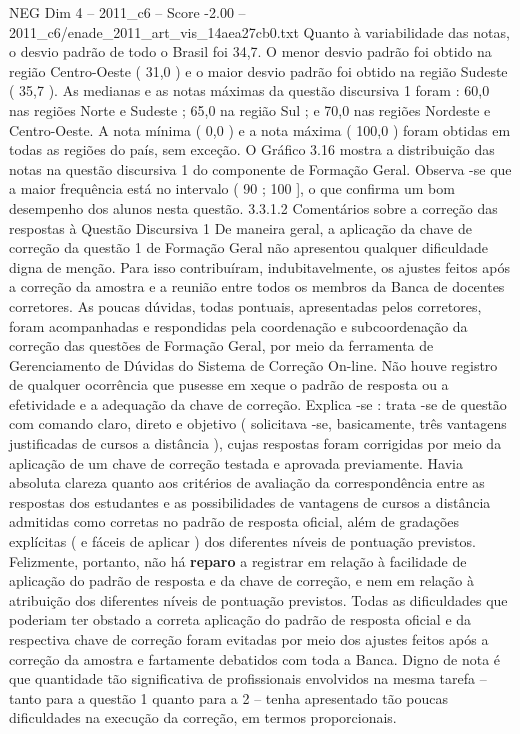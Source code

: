 \begin{textsample}{NEG Dim 4 – 2011\_c6 – Score -2.00 – 2011\_c6/enade\_2011\_art\_vis\_14aea27cb0.txt}
Quanto à variabilidade das notas, o desvio padrão de todo o Brasil foi 34,7.
O menor desvio padrão foi obtido na região Centro-Oeste ( 31,0 ) e o maior desvio padrão foi obtido na região Sudeste ( 35,7 ).
As medianas e as notas máximas da questão discursiva 1 foram : 60,0 nas regiões Norte e Sudeste ; 65,0 na região Sul ; e 70,0 nas regiões Nordeste e Centro-Oeste.
A nota mínima ( 0,0 ) e a nota máxima ( 100,0 ) foram obtidas em todas as regiões do país, sem exceção.
O Gráfico 3.16 mostra a distribuição das notas na questão discursiva 1 do componente de Formação Geral.
Observa -se que a maior frequência está no intervalo ( 90 ; 100 ], o que confirma um bom desempenho dos alunos nesta questão. 3.3.1.2 Comentários sobre a correção das respostas à Questão Discursiva 1 De maneira geral, a aplicação da chave de correção da questão 1 de Formação Geral não apresentou qualquer dificuldade digna de menção.
Para isso contribuíram, indubitavelmente, os ajustes feitos após a correção da amostra e a reunião entre todos os membros da Banca de docentes corretores.
As poucas dúvidas, todas pontuais, apresentadas pelos corretores, foram acompanhadas e respondidas pela coordenação e subcoordenação da correção das questões de Formação Geral, por meio da ferramenta de Gerenciamento de Dúvidas do Sistema de Correção On-line.
Não houve registro de qualquer ocorrência que pusesse em xeque o padrão de resposta ou a efetividade e a adequação da chave de correção.
Explica -se : trata -se de questão com comando claro, direto e objetivo ( solicitava -se, basicamente, três vantagens justificadas de cursos a distância ), cujas respostas foram corrigidas por meio da aplicação de um chave de correção testada e aprovada previamente.
Havia absoluta clareza quanto aos critérios de avaliação da correspondência entre as respostas dos estudantes e as possibilidades de vantagens de cursos a distância admitidas como corretas no padrão de resposta oficial, além de gradações explícitas ( e fáceis de aplicar ) dos diferentes níveis de pontuação previstos.
Felizmente, portanto, não há \textbf{reparo} a registrar em relação à facilidade de aplicação do padrão de resposta e da chave de correção, e nem em relação à atribuição dos diferentes níveis de pontuação previstos.
Todas as dificuldades que poderiam ter obstado a correta aplicação do padrão de resposta oficial e da respectiva chave de correção foram evitadas por meio dos ajustes feitos após a correção da amostra e fartamente debatidos com toda a Banca.
Digno de nota é que quantidade tão significativa de profissionais envolvidos na mesma tarefa – tanto para a questão 1 quanto para a 2 – tenha apresentado tão poucas dificuldades na execução da correção, em termos proporcionais.

\end{textsample}
